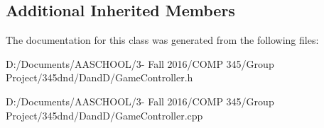 \subsection*{Additional Inherited Members}


The documentation for this class was generated from the following files\+:\begin{DoxyCompactItemize}
\item 
D\+:/\+Documents/\+A\+A\+S\+C\+H\+O\+O\+L/3-\/ Fall 2016/\+C\+O\+M\+P 345/\+Group Project/345dnd/\+Dand\+D/Game\+Controller.\+h\item 
D\+:/\+Documents/\+A\+A\+S\+C\+H\+O\+O\+L/3-\/ Fall 2016/\+C\+O\+M\+P 345/\+Group Project/345dnd/\+Dand\+D/Game\+Controller.\+cpp\end{DoxyCompactItemize}
